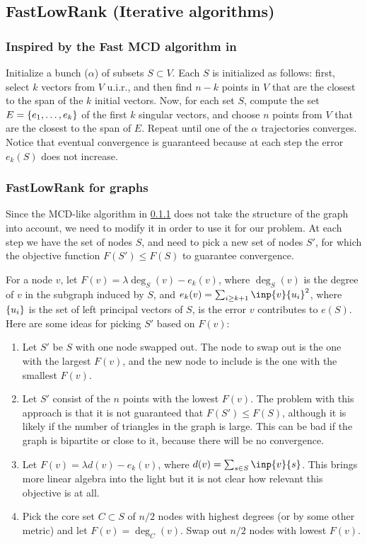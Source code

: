 \documentclass{article}
\begin{document}
\subsection{FastLowRank (Iterative algorithms)}
\subsubsection{Inspired by the Fast MCD algorithm in \cite{rousseeuw1999fast}}\label{alg: fast MCD-like}
Initialize a bunch ($\alpha$) of subsets $S\subset V$. Each $S$ is initialized as follows: first, select $k$ vectors from $V$ u.i.r., and then find $n-k$ points in $V$ that are the closest to the span of the $k$ initial vectors. Now, for each set $S$, compute the set $E = \left\{e_1,\dots, e_k\right\}$ of the first $k$ singular vectors, and choose $n$ points from $V$ that are the closest to the span of $E$. Repeat until one of the $\alpha$ trajectories converges. Notice that eventual convergence is guaranteed because at each step the error $e_k(S)$ does not increase.

\subsubsection{FastLowRank for graphs}
Since the MCD-like algorithm in \ref{alg: fast MCD-like} does not take the structure of the graph into account, we need to modify it in order to use it for our problem. At each step we have the set of nodes $S$, and need to pick a new set of nodes $S'$, for which the objective function $F(S') \leq F(S)$ to guarantee convergence.

For a node $v$, let $F(v) = \lambda \deg_S(v) - e_k(v)$, where $\deg_S(v)$ is the degree of $v$ in the subgraph induced by $S$, and $e_k(v) = \sum_{i\geq k+1}\inp{v}{u_i}^2$, where $\left\{u_i\right\}$ is the set of left principal vectors of $S$, is the error $v$ contributes to $e(S)$. Here are some ideas for picking $S'$ based on $F(v)$:

\begin{enumerate}
    \item Let $S'$ be $S$ with one node swapped out. The node to swap out is the one with the largest $F(v)$, and the new node to include is the one with the smallest $F(v)$.
    \item Let $S'$ consist of the $n$ points with the lowest $F(v)$. The problem with this approach is that it is not guaranteed that $F(S') \leq F(S)$, although it is likely if the number of triangles in the graph is large. This can be bad if the graph is bipartite or close to it, because there will be no convergence.
    \item Let $F(v) = \lambda d(v) - e_k(v)$, where $d(v) = \sum_{s\in S}\inp{v}{s}$. This brings more linear algebra into the light but it is not clear how relevant this objective is at all.
    \item Pick the core set $C \subset S$ of $n/2$ nodes with highest degrees (or by some other metric) and let $F(v) = \deg_C(v)$. Swap out $n/2$ nodes with lowest $F(v)$.
\end{enumerate}
\end{document}
